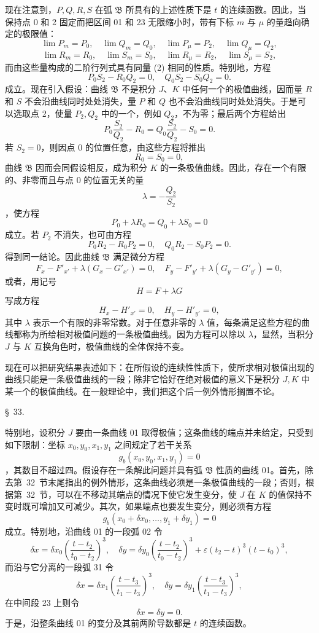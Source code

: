 \documentclass[11pt,a4paper,leqno]{article}
\begin{document}
现在注意到，$P,Q,R,S$ 在弧 $\mathfrak{B}$ 所具有的上述性质下是 $t$ 的连续函数。因此，当保持点 0 和 2 固定而把区间 01 和 23 无限缩小时，带有下标 $m$ 与 $\mu$ 的量趋向确定的极限值：
\[
\lim P_m=P_0,
\quad
\lim Q_m=Q_0,
\quad
\lim P_\mu=P_2,
\quad
\lim Q_\mu=Q_2,
\]
\[
\lim R_m=R_0,
\quad
\lim S_m=S_0,
\quad
\lim R_\mu=R_2,
\quad
\lim S_\mu=S_2,
\]
而由这些量构成的二阶行列式具有同量 (2) 相同的性质。特别地，方程
\[
P_0S_2-R_0Q_2=0,
\quad
Q_0S_2-S_0Q_2=0.
\]
成立。现在引入假设：曲线 $\mathfrak{B}$ 不是积分 $J$、$K$ 中任何一个的极值曲线，因而量 $R$ 和 $S$ 不会沿曲线同时处处消失，量 $P$ 和 $Q$ 也不会沿曲线同时处处消失。于是可以选取点 2，使量 $P_2,Q_2$ 中的一个，例如 $Q_2$，不为零；最后两个方程给出
\[
P_0\frac{S_2}{Q_2}-R_0=Q_0\frac{S_2}{Q_2}-S_0=0.
\]
若 $S_2=0$，则因点 0 的位置任意，由这些方程将推出
\[
R_0=S_0=0,
\]
曲线 $\mathfrak{B}$ 因而会同假设相反，成为积分 $K$ 的一条极值曲线。因此，存在一个有限的、非零而且与点 0 的位置无关的量
\[
\lambda=-\frac{Q_2}{S_2}
\]
，使方程
\[
P_0+\lambda R_0=Q_0+\lambda S_0=0
\]
成立。若 $P_2$ 不消失，也可由方程
\[
P_0R_2-R_0P_2=0,
\quad
Q_0R_2-S_0P_2=0.
\]
得到同一结论。因此曲线 $\mathfrak{B}$ 满足微分方程
\[
F_x-F'_{x'}+\lambda(G_x-G'_{x'})=0,
\quad
F_y-F'_{y'}+\lambda(G_y-G'_{y'})=0,
\]
或者，用记号
\[
H=F+\lambda G
\]
写成方程
\[
H_x-H'_{x'}=0,
\quad
H_y-H'_{y'}=0,
\]
其中 $\lambda$ 表示一个有限的非零常数。对于任意非零的 $\lambda$ 值，每条满足这些方程的曲线都称为所给相对极值问题的一条极值曲线。因为方程可以除以 $\lambda$，显然，当积分 $J$ 与 $K$ 互换角色时，极值曲线的全体保持不变。

现在可以把研究结果表述如下：在所假设的连续性性质下，使所求相对极值出现的曲线只能是一条极值曲线的一段；除非它恰好在绝对极值的意义下是积分 $J,K$ 中某一个的极值曲线。在一般理论中，我们把这个后一例外情形搁置不论。

\begin{center}{\large \S~33.}\end{center}

特别地，设积分 $J$ 要由一条曲线 01 取得极值；这条曲线的端点并未给定，只受到如下限制：坐标 $x_0,y_0,x_1,y_1$ 之间规定了若干关系
\[
g_b(x_0,y_0,x_1,y_1)=0
\]
，其数目不超过四。假设存在一条解此问题并具有弧 $\mathfrak{B}$ 性质的曲线 01。首先，除去第~32~节末尾指出的例外情形，这条曲线必须是一条极值曲线的一段；否则，根据第~32~节，可以在不移动其端点的情况下使它发生变分，使 $J$ 在 $K$ 的值保持不变时既可增加又可减少。其次，如果端点也要发生变分，则必须有方程
\begin{equation}\tag{3}
g_b(x_0+\delta x_0,\ldots,y_1+\delta y_1)=0
\end{equation}
成立。特别地，沿曲线 01 的一段弧 02 令
\[
\delta x=\delta x_0\left(\frac{t-t_2}{t_0-t_2}\right)^3,
\quad
\delta y=\delta y_0\left(\frac{t-t_2}{t_0-t_2}\right)^3
+\varepsilon(t_2-t)^3(t-t_0)^3,
\]
而沿与它分离的一段弧 31 令
\[
\delta x=\delta x_1\left(\frac{t-t_3}{t_1-t_3}\right)^3,
\quad
\delta y=\delta y_1\left(\frac{t-t_3}{t_1-t_3}\right)^3,
\]
在中间段 23 上则令
\[
\delta x=\delta y=0.
\]
于是，沿整条曲线 01 的变分及其前两阶导数都是 $t$ 的连续函数。
\end{document}
